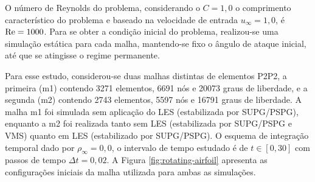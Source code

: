 O número de Reynolds do problema, considerando o $C=1,0$ o comprimento característico do problema e baseado na velocidade de entrada $u_\infty=1,0$, é $\mathrm{Re}=1000$. Para se obter a condição inicial do problema, realizou-se uma simulação estática para cada malha, mantendo-se fixo o ângulo de ataque inicial, até que se atingisse o regime permanente.

Para esse estudo, considerou-se duas malhas distintas de elementos P2P2, a primeira (m1) contendo 3271 elementos, 6691 nós e 20073 graus de liberdade, e a segunda (m2) contendo 2743 elementos, 5597 nós e 16791 graus de liberdade. A malha m1 foi simulada sem aplicação do LES (estabilizada por SUPG/PSPG), enquanto a m2 foi realizada tanto sem LES (estabilizada por SUPG/PSPG e VMS) quanto em LES (estabilizado por SUPG/PSPG). O esquema de integração temporal dado por $\rho_\infty=0,0$, o intervalo de tempo estudado é de $t\in[0,30]$ com passos de tempo $\Delta t=0,02$. A Figura \ref{fig:rotating-airfoil} apresenta as configurações iniciais da malha utilizada para ambas as simulações.

